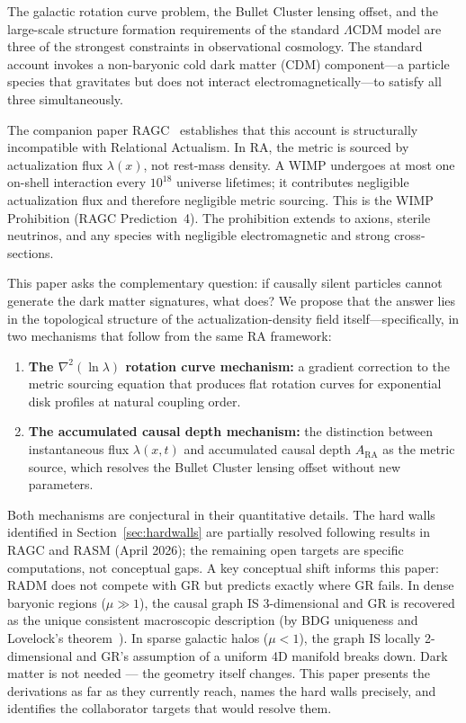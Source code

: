 \documentclass[11pt,a4paper]{article}
\theoremstyle{plain}
\theoremstyle{definition}
\theoremstyle{remark}
\begin{document}
The galactic rotation curve problem, the Bullet Cluster lensing offset, and the
large-scale structure formation requirements of the standard $\Lambda$CDM model
are three of the strongest constraints in observational cosmology. The standard
account invokes a non-baryonic cold dark matter (CDM) component---a particle
species that gravitates but does not interact electromagnetically---to satisfy all
three simultaneously.

The companion paper RAGC~\citep{Sandeman2026b} establishes that this account is
structurally incompatible with Relational Actualism. In RA, the metric is sourced
by actualization flux $\lambda(x)$, not rest-mass density. A WIMP undergoes at
most one on-shell interaction every $10^{18}$ universe lifetimes; it contributes
negligible actualization flux and therefore negligible metric sourcing. This is the
WIMP Prohibition (RAGC Prediction~4). The prohibition extends to axions, sterile
neutrinos, and any species with negligible electromagnetic and strong cross-sections.

This paper asks the complementary question: if causally silent particles cannot
generate the dark matter signatures, what does? We propose that the answer lies in
the topological structure of the actualization-density field itself---specifically,
in two mechanisms that follow from the same RA framework:

\begin{enumerate}[noitemsep]
  \item \textbf{The $\nabla^2(\ln\lambda)$ rotation curve mechanism:} a gradient
  correction to the metric sourcing equation that produces flat rotation curves
  for exponential disk profiles at natural coupling order.
  \item \textbf{The accumulated causal depth mechanism:} the distinction between
  instantaneous flux $\lambda(x,t)$ and accumulated causal depth $A_{\mathrm{RA}}$
  as the metric source, which resolves the Bullet Cluster lensing offset without
  new parameters.
\end{enumerate}

Both mechanisms are conjectural in their quantitative details.
The hard walls identified in Section~\ref{sec:hardwalls} are partially
resolved following results in RAGC and RASM (April 2026); the remaining
open targets are specific computations, not conceptual gaps.
A key conceptual shift informs this paper: RADM does not compete with GR
but predicts exactly where GR fails. In dense baryonic regions ($\mu \gg 1$),
the causal graph IS 3-dimensional and GR is recovered as the unique
consistent macroscopic description (by BDG uniqueness and
Lovelock's theorem~\citep{Sandeman2026b}).
In sparse galactic halos ($\mu < 1$), the graph IS locally 2-dimensional
and GR's assumption of a uniform 4D manifold breaks down. Dark matter is not
needed --- the geometry itself changes. This paper presents the derivations
as far as they currently reach, names the hard walls precisely, and identifies
the collaborator targets that would resolve them.
\end{document}

